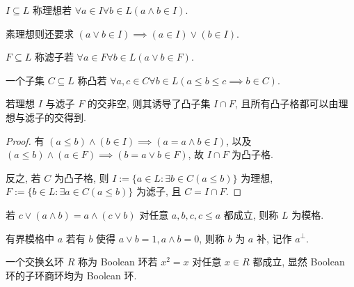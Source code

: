 \begin{definition}[理想]
    \(I \subseteq L\) 称理想若 \(\forall a \in I \forall b \in L (a \wedge b \in I)\).

    素理想则还要求 \((a \vee b \in I) \implies (a \in I) \lor (b \in I)\).
\end{definition}

\begin{definition}[滤子]
    \(F \subseteq L\) 称滤子若 \(\forall a \in F \forall b \in L (a \vee b \in F)\).
\end{definition}

\begin{definition}[凸]
    一个子集 \(C \subseteq L\) 称凸若 \(\forall a,c \in C \forall b \in L (a \leq b \leq c \implies b \in C)\).
\end{definition}

\begin{lemma}
    若理想 \(I\) 与滤子 \(F\) 的交非空, 则其诱导了凸子集 \(I \cap F\), 且所有凸子格都可以由理想与滤子的交得到.

    \begin{proof}
        有 \((a \leq b) \land (b \in I) \implies (a = a \wedge b \in I)\), 以及 \((a \leq b) \land (a \in F) \implies (b = a \vee b \in F)\), 故 \(I \cap F\) 为凸子格.

        反之, 若 \(C\) 为凸子格, 则 \(I := \{a \in L : \exists b \in C (a \leq b)\}\) 为理想, \(F := \{b \in L : \exists a \in C(a \leq b)\}\) 为滤子, 且 \(C = I \cap F\).
    \end{proof}
\end{lemma}

\begin{definition}[模格]
    若 \(c \vee (a \wedge b) = a \wedge (c \vee b)\) 对任意 \(a,b,c,c \leq a\) 都成立, 则称 \(L\) 为模格.
\end{definition}

\begin{definition}
    有界模格中 \(a\) 若有 \(b\) 使得 \(a \vee b = 1, a \wedge b = 0\), 则称 \(b\) 为 \(a\) 补, 记作 \(a^{\bot}\).
\end{definition}

\begin{definition}[Boolean 环]
    \label {definition:boolean ring}
    一个交换幺环 \(R\) 称为 Boolean 环若 \(x^2 = x\) 对任意 \(x \in R\) 都成立, 显然 Boolean 环的子环商环均为 Boolean 环.
\end{definition}

